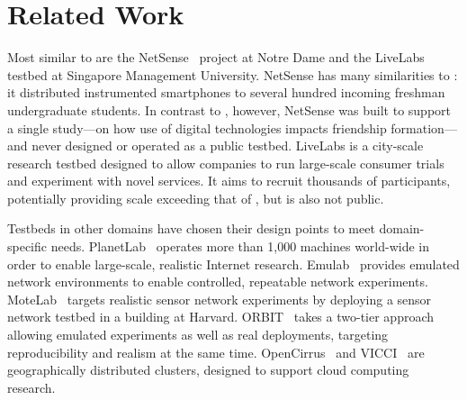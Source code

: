 \section{Related Work}
\label{sec:related}

Most similar to \PhoneLab{} are the NetSense~\cite{netsense-hotplanet}
project at Notre Dame and the LiveLabs~\cite{FIXME-livelabs} testbed at
Singapore Management University. NetSense has many similarities to
\PhoneLab{}: it distributed instrumented smartphones to several hundred
incoming freshman undergraduate students. In contrast to \PhoneLab{},
however, NetSense was built to support a single study---on how use of digital
technologies impacts friendship formation---and never designed or operated as
a public testbed. LiveLabs is a city-scale research testbed designed to allow
companies to run large-scale consumer trials and experiment with novel
services. It aims to recruit thousands of participants, potentially providing
scale exceeding that of \PhoneLab{}, but is also not public.

Testbeds in other domains have chosen their design points to meet
domain-specific needs. PlanetLab~\cite{peterson:ccr:2003} operates more than
1,000 machines world-wide in order to enable large-scale, realistic Internet
research. Emulab~\cite{white:osdi:2002} provides emulated network
environments to enable controlled, repeatable network experiments.
MoteLab~\cite{werner-allen:ipsn:2005} targets realistic sensor network
experiments by deploying a sensor network testbed in a building at Harvard.
ORBIT~\cite{raychaudhuri:tridentcom:2005} takes a two-tier approach allowing
emulated experiments as well as real deployments, targeting reproducibility
and realism at the same time. OpenCirrus~\cite{avetisyan:computer:2010} and
VICCI~\cite{vicci} are geographically distributed clusters, designed to
support cloud computing research.
